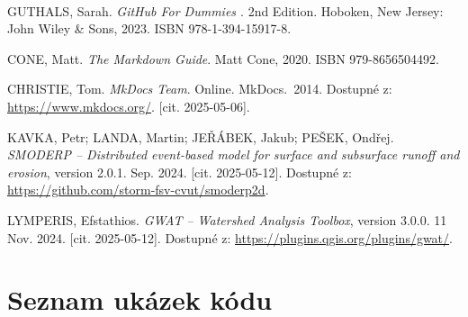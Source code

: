 \documentclass[a4paper,oneside,12pt]{book}
\begin{document}
\begin{thebibliography}{1}
GUTHALS, Sarah. \textit{GitHub\texorpdfstring{\textsuperscript{\textregistered}}{ (R)} For Dummies \texorpdfstring{\textsuperscript{\textregistered}}{(R)}}. 2nd Edition. Hoboken, New Jersey: John Wiley \& Sons, 2023. ISBN 978-1-394-15917-8.

CONE, Matt. \textit{The Markdown Guide}. Matt Cone, 2020. ISBN 979-8656504492.

CHRISTIE, Tom. \textit{MkDocs Team}. Online. MkDocs.~2014. Dostupné z: \url{https://www.mkdocs.org/}. [cit. 2025-05-06].

KAVKA, Petr; LANDA, Martin; JEŘÁBEK, Jakub; PEŠEK, Ondřej. \textit{SMODERP – Distributed event-based model for surface and subsurface runoff and erosion}, version 2.0.1. Sep. 2024. [cit. 2025-05-12]. Dostupné z: \url{https://github.com/storm-fsv-cvut/smoderp2d}.

LYMPERIS, Efstathios. \textit{GWAT – Watershed Analysis Toolbox}, version 3.0.0. 11 Nov. 2024. [cit. 2025-05-12]. Dostupné z: \url{https://plugins.qgis.org/plugins/gwat/}.


\end{thebibliography}

\label{list_pics}
\listoffigures

\label{list_tables}
\listoftables
\chapter*{Seznam ukázek kódu} \label{list_code}
\end{document}
